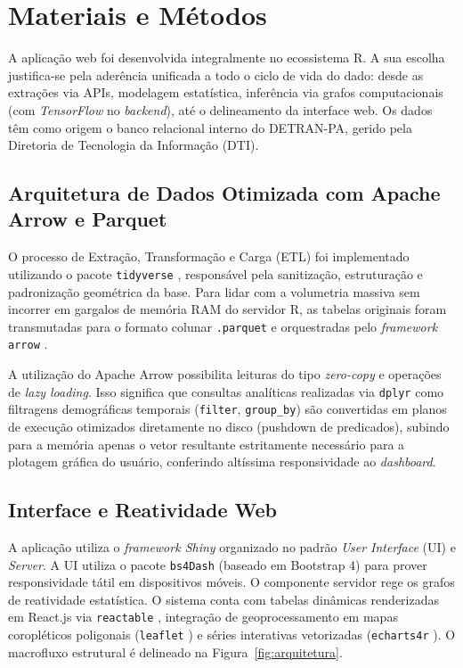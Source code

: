 \documentclass[12pt]{article}
\begin{document}

\section{Materiais e Métodos}

A aplicação web foi desenvolvida integralmente no ecossistema R. A sua escolha justifica-se pela aderência unificada a todo o ciclo de vida do dado: desde as extrações via APIs, modelagem estatística, inferência via grafos computacionais (com \textit{TensorFlow} no \textit{backend}), até o delineamento da interface web. Os dados têm como origem o banco relacional interno do DETRAN-PA, gerido pela Diretoria de Tecnologia da Informação (DTI).

\subsection{Arquitetura de Dados Otimizada com Apache Arrow e Parquet}

O processo de Extração, Transformação e Carga (ETL) foi implementado utilizando o pacote \texttt{tidyverse} \cite{tidyverse2019}, responsável pela sanitização, estruturação e padronização geométrica da base. Para lidar com a volumetria massiva sem incorrer em gargalos de memória RAM do servidor R, as tabelas originais foram transmutadas para o formato colunar \texttt{.parquet} e orquestradas pelo \textit{framework} \texttt{arrow} \cite{arrow2026}. 

A utilização do Apache Arrow possibilita leituras do tipo \textit{zero-copy} e operações de \textit{lazy loading}. Isso significa que consultas analíticas realizadas via \texttt{dplyr} \cite{dplyr2026} como filtragens demográficas temporais (\texttt{filter}, \texttt{group\_by}) são convertidas em planos de execução otimizados diretamente no disco (pushdown de predicados), subindo para a memória apenas o vetor resultante estritamente necessário para a plotagem gráfica do usuário, conferindo altíssima responsividade ao \textit{dashboard}.

\subsection{Interface e Reatividade Web}

A aplicação utiliza o \textit{framework Shiny} organizado no padrão \textit{User Interface} (UI) e \textit{Server}. A UI utiliza o pacote \texttt{bs4Dash} (baseado em Bootstrap 4) para prover responsividade tátil em dispositivos móveis. O componente servidor rege os grafos de reatividade estatística. O sistema conta com tabelas dinâmicas renderizadas em React.js via \texttt{reactable} \cite{reactable2026}, integração de geoprocessamento em mapas coropléticos poligonais (\texttt{leaflet} \cite{leaflet2025}) e séries interativas vetorizadas (\texttt{echarts4r} \cite{echarts4r2026}). O macrofluxo estrutural é delineado na Figura~\ref{fig:arquitetura}.
\end{document}
